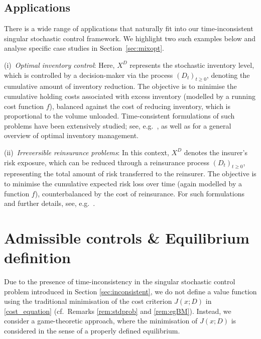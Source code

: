 \documentclass[11pt]{article} %
\numberwithin{komcounter}{section}
\begin{document}
\subsection{Applications}
\label{sec:applications} 

There is a wide range of applications that naturally fit into our time-inconsistent singular stochastic control framework. We highlight two such examples below and analyse specific case studies in Section~\ref{sec:mixopt}.

{\rm (i)}~{\it Optimal inventory control}: 
Here, $X^D$ represents the stochastic inventory level, which is controlled by a decision-maker via the process $(D_t)_{t \geq0}$, denoting the cumulative amount of inventory reduction.
The objective is to minimise the cumulative holding costs associated with excess inventory (modelled by a running cost function $f$), balanced against the cost of reducing inventory, which is proportional to the volume unloaded. 
Time-consistent formulations of such problems have been extensively studied; see, e.g.~\cite{
bather1966continuous,
Brownianinventory1,
Brownianinventory2,
doi:10.1137/21M1442115,
HARRISON1978179,
harrison1983instantaneous}, as well as \cite{zipkin2000foundations} for a general overview of optimal inventory management.

{\rm (ii)}~{\it Irreversible reinsurance problems}: 
In this context, $X^D$ denotes the insurer’s risk exposure, which can be reduced through a reinsurance process $(D_t)_{t \geq0}$, representing the total amount of risk transferred to the reinsurer. 
The objective is to minimise the cumulative expected risk loss over time (again modelled by a function $f$), counterbalanced by the cost of reinsurance. For such formulations and further details, see, e.g.~\cite{liang2024equilibria,yan2022irreversible}.

 




\section{Admissible controls \& Equilibrium definition}
\label{sec:Admissible}

Due to the presence of time-inconsistency in the singular stochastic control problem introduced in Section \ref{sec:inconsistent},  
we do not define a value function using the traditional minimisation of the cost criterion $J(x; D)$ in \eqref{cost_equation} (cf.\ Remarks \ref{rem:stdprob} and \ref{rem:egBM}). 
Instead, we consider a game-theoretic approach, where the minimisation of $J(x; D)$ is considered in the sense of a properly defined equilibrium. 
\end{document}
